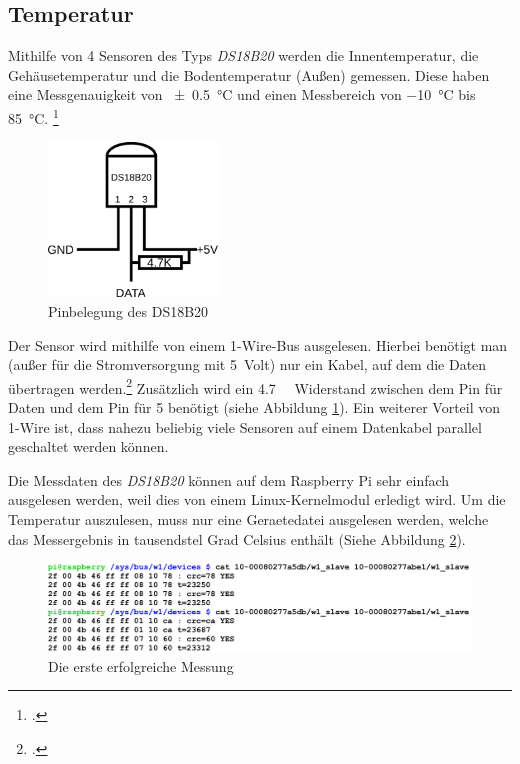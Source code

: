 \subsection{Temperatur}
\label{subsec:Temperatur}

Mithilfe von 4 Sensoren des Typs \emph{DS18B20} werden die Innentemperatur, die Gehäusetemperatur und die Bodentemperatur (Außen) gemessen. Diese haben eine Messgenauigkeit von \SI{\pm 0.5}{\degreeCelsius}  und einen Messbereich von \SI{-10}{\degreeCelsius}  bis \SI{+85}{\degreeCelsius}. \footcite[20]{temp}

\begin{figure}[h]
  \centering
     \includegraphics[width=0.4\textwidth]{figures/temp_pin.png}
  \caption{Pinbelegung des DS18B20}
  \label{fig:temp_pin}
\end{figure}

Der Sensor wird mithilfe von einem \gls{1-Wire}-\gls{Bus} ausgelesen. Hierbei benötigt man (außer für die Stromversorgung mit \SI{5}{\gls{Volt}}) nur ein Kabel, auf dem die Daten übertragen werden.\footcite{1-wire} Zusätzlich wird ein \SI{4.7}{\kilo{}} Widerstand zwischen dem Pin für Daten und dem Pin für \SI[retain-explicit-plus]{+5}{} benötigt (siehe Abbildung \ref{fig:temp_pin}).
Ein weiterer Vorteil von 1-Wire ist, dass nahezu beliebig viele Sensoren auf einem Datenkabel parallel geschaltet werden können.

Die Messdaten des \emph{DS18B20} können auf dem Raspberry Pi sehr einfach ausgelesen werden, weil dies von einem Linux-\gls{Kernelmodul} erledigt wird. Um die Temperatur auszulesen, muss  nur eine \gls{Geraetedatei} ausgelesen werden, welche das Messergebnis in tausendstel Grad Celsius enthält (Siehe Abbildung \ref{fig:temp_screenshot}).

\begin{figure}[h]
  \centering
     \includegraphics[width=\textwidth]{figures/temp_screenshot.png}
  \caption{Die erste erfolgreiche Messung}
  \label{fig:temp_screenshot}
\end{figure}

